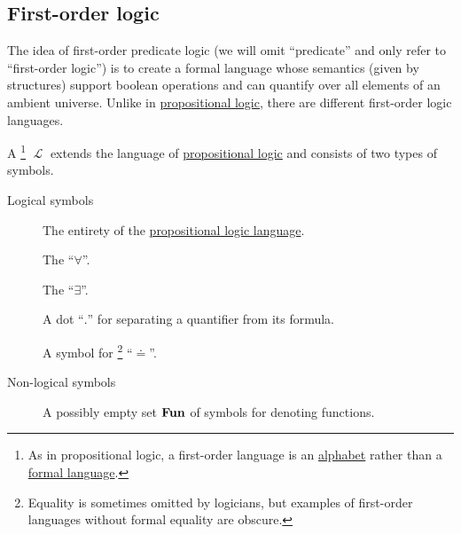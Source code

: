 \subsection{First-order logic}\label{subsec:first_order_logic}

The idea of first-order predicate logic (we will omit \enquote{predicate} and only refer to \enquote{first-order logic}) is to create a formal language whose semantics (given by structures) support boolean operations and can quantify over all elements of an ambient universe. Unlike in \hyperref[subsec:propositional_logic]{propositional logic}, there are different first-order logic languages.

\begin{definition}\label{def:first_order_language}
  A \footnote{As in propositional logic, a first-order language is an \hyperref[def:formal_language]{alphabet} rather than a \hyperref[def:formal_language/language]{formal language}.} \( \mscrL \) extends the language of \hyperref[subsec:propositional_logic]{propositional logic} and consists of two types of symbols.

  \begin{description}
    \item[Logical symbols]
    \hfill
    \begin{thmenum}[series=def:first_order_language]
       The entirety of the \hyperref[subsec:propositional_logic]{propositional logic language}.

       The  \enquote{\( \forall \)}.

       The  \enquote{\( \exists \)}.

       A dot \enquote{\( . \)} for separating a quantifier from its formula.

       A symbol for \footnote{Equality is sometimes omitted by logicians, but examples of first-order languages without formal equality are obscure.} \enquote{\( \doteq \)}.
    \end{thmenum}

    \item[Non-logical symbols]
    \hfill
    \begin{thmenum}[resume=def:first_order_language]
       A possibly empty  set \( \operatorname{\mathbf{Fun}} \) of symbols for denoting functions.


\end{thmenum}
\end{description}
\end{definition}

